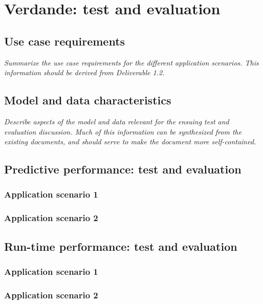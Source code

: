 \documentclass[11pt, oneside]{article}   	%
\numberwithin{figure}{section}
\numberwithin{equation}{section}
\numberwithin{table}{section}
\begin{document}
\section{Verdande: test and evaluation}

\subsection{Use case requirements}

\emph{Summarize the use case requirements for the different application scenarios. This information should be
  derived from Deliverable 1.2.}

\subsection{Model and data characteristics}

\emph{Describe aspects of the model and data relevant for the ensuing test and evaluation discussion. Much of
  this information can be synthesized from the existing documents, and should serve to make the document more
  self-contained. }




\subsection{Predictive performance: test and evaluation}

\subsubsection{Application scenario 1}

\subsubsection{Application scenario 2}

\subsection{Run-time performance: test and evaluation}

\subsubsection{Application scenario 1}

\subsubsection{Application scenario 2}






\end{document}
